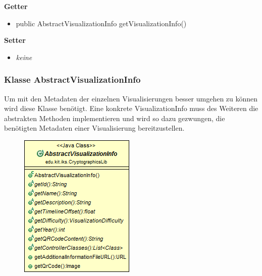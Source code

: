 \documentclass{article}
\begin{document}
      \textbf{Getter}
      \begin{itemize}
		\item public AbstractVisualizationInfo getVisualizationInfo()
      \end{itemize}
      
      \textbf{Setter}
      \begin{itemize}
        \item \textit{keine}
      \end{itemize}
	
	\subsubsection{Klasse AbstractVisualizationInfo}
	  Um mit den Metadaten der einzelnen Visualisierungen besser umgehen zu können
	  wird diese Klasse benötigt. Eine konkrete VisualizationInfo muss des Weiteren
	  die abstrakten Methoden implementieren und wird so dazu gezwungen, die 
	  benötigten Metadaten einer Visualisierung bereitzustellen.
	
      \begin{figure}[H]
        \centering
        \includegraphics[width=\textwidth]{resources/edu-kit-iks-CryptographicsLib-AbstractVisualizationInfo}
      \end{figure}
	
\end{document}
